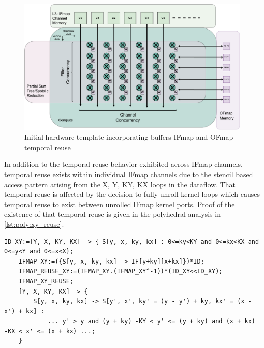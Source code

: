\begin{figure}[]
    \centering
    \includegraphics[scale=0.4]{fig/reuse_illus.pdf}
    \caption{Initial hardware template incorporating buffers IFmap and OFmap temporal reuse}
    \label{fig:reuse_illus}
\end{figure}

In addition to the temporal reuse behavior exhibited across IFmap channels,
temporal reuse exists within individual IFmap channels due to the stencil based
access pattern arising from the X, Y, KY, KX loops in the dataflow. That
temporal reuse is affected by the decision to fully unroll kernel loops which
causes temporal reuse to exist between unrolled IFmap kernel ports. Proof of the
existence of that temporal reuse is given in the polyhedral analysis in
\autoref{lst:poly:xy_reuse}. 

\begin{lstlisting}[caption=Analysis of IFmap channel reuse, label={lst:poly:xy_reuse}]
    ID_XY:=[Y, X, KY, KX] -> { S[y, x, ky, kx] : 0<=ky<KY and 0<=kx<KX and 0<=y<Y and 0<=x<X};
    IFMAP_XY:=({S[y, x, ky, kx] -> IF[y+ky][x+kx]})*ID;
    IFMAP_REUSE_XY:=(IFMAP_XY.(IFMAP_XY^-1))*(ID_XY<<ID_XY);
    IFMAP_XY_REUSE;
    [Y, X, KY, KX] -> { 
        S[y, x, ky, kx] -> S[y', x', ky' = (y - y') + ky, kx' = (x - x') + kx] : 
            ... y' > y and (y + ky) -KY < y' <= (y + ky) and (x + kx) -KX < x' <= (x + kx) ...;
    }
\end{lstlisting}

